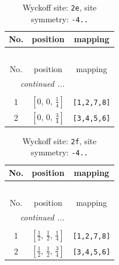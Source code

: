 \documentclass[fleqn,8pt]{jsarticle}
\begin{document}
\begin{longtable}{ccc}
\caption{Wyckoff site: {\tt 2e}, site symmetry: {\tt -4..}}
 \\
 \hline \hline
No. & position & mapping \\ \hline \endfirsthead

\multicolumn{2}{l}{\tablename\ \thetable{}} \\
 \hline \hline
No. & position & mapping \\ \hline \endhead

 \hline \hline
\multicolumn{2}{r}{\footnotesize\it continued ...} \\ \endfoot

 \hline \hline
\multicolumn{2}{r}{} \\ \endlastfoot

1 & $\left[ 0,\, 0,\, \frac{1}{4} \right]$ & {\tt [1,2,7,8]} \\ \hline
2 & $\left[ 0,\, 0,\, \frac{3}{4} \right]$ & {\tt [3,4,5,6]} \\
\end{longtable}
\renewcommand{\arraystretch}{1.2}
\begin{longtable}{ccc}
\caption{Wyckoff site: {\tt 2f}, site symmetry: {\tt -4..}}
 \\
 \hline \hline
No. & position & mapping \\ \hline \endfirsthead

\multicolumn{2}{l}{\tablename\ \thetable{}} \\
 \hline \hline
No. & position & mapping \\ \hline \endhead

 \hline \hline
\multicolumn{2}{r}{\footnotesize\it continued ...} \\ \endfoot

 \hline \hline
\multicolumn{2}{r}{} \\ \endlastfoot

1 & $\left[ \frac{1}{2},\, \frac{1}{2},\, \frac{1}{4} \right]$ & {\tt [1,2,7,8]} \\ \hline
2 & $\left[ \frac{1}{2},\, \frac{1}{2},\, \frac{3}{4} \right]$ & {\tt [3,4,5,6]} \\
\end{longtable}
\renewcommand{\arraystretch}{1.2}
\end{document}
